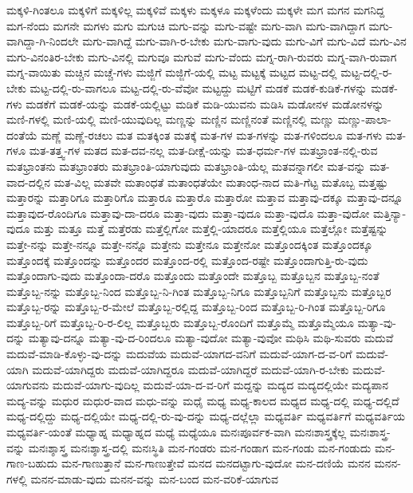 {ಮಕ್ಕಳಿ-ಗಿಂತಲೂ
ಮಕ್ಕಳಿಗೆ
ಮಕ್ಕಳಿಲ್ಲ
ಮಕ್ಕಳಿವೆ
ಮಕ್ಕಳು
ಮಕ್ಕಳೂ
ಮಕ್ಕಳೆಂದು
ಮಕ್ಕಳೇ
ಮಗ
ಮಗನ
ಮಗನಿದ್ದ
ಮಗ-ನೆಂದು
ಮಗನೇ
ಮಗಳು
ಮಗು
ಮಗುಚಿ
ಮಗು-ವನ್ನು
ಮಗು-ವಷ್ಟೇ
ಮಗು-ವಾಗಿ
ಮಗು-ವಾಗಿದ್ದಾಗ
ಮಗು-ವಾಗಿದ್ದಾ-ಗಿ-ನಿಂದಲೇ
ಮಗು-ವಾಗಿದ್ದೆ
ಮಗು-ವಾಗಿ-ರ-ಬೇಕು
ಮಗು-ವಾಗು-ವುದು
ಮಗು-ವಿಗೆ
ಮಗು-ವಿದೆ
ಮಗು-ವಿನ
ಮಗು-ವಿನಂತಿರ-ಬೇಕು
ಮಗು-ವಿನಲ್ಲಿ
ಮಗುವೂ
ಮಗುವೆ
ಮಗು-ವೆಂದು
ಮಗ್ನ-ರಾಗಿ-ರುವರು
ಮಗ್ನ-ವಾಗಿ-ರುವಾಗ
ಮಗ್ನ-ವಾಯಿತು
ಮಚ್ಚಿನ
ಮಚ್ಚೆ-ಗಳು
ಮಜ್ಜಿಗೆ
ಮಜ್ಜಿಗೆ-ಯಲ್ಲಿ
ಮಟ್ಟ
ಮಟ್ಟಕ್ಕೆ
ಮಟ್ಟದ
ಮಟ್ಟ-ದಲ್ಲಿ
ಮಟ್ಟ-ದಲ್ಲಿ-ರ-ಬೇಕು
ಮಟ್ಟ-ದಲ್ಲಿ-ರು-ವಾಗಲೂ
ಮಟ್ಟ-ದಲ್ಲಿ-ರು-ವೆವೋ
ಮಟ್ಟದ್ದು
ಮಟ್ಟಿಗೆ
ಮಡಕೆ
ಮಡಕೆ-ಕುಡಿಕೆ-ಗಳನ್ನು
ಮಡಕೆ-ಗಳು
ಮಡಕೆಗೆ
ಮಡಕೆ-ಯನ್ನು
ಮಡಕೆ-ಯಲ್ಲಿಟ್ಟು
ಮಡಿಕೆ
ಮಡಿ-ಯುವನು
ಮಡಿಸಿ
ಮಡೋನಳ
ಮಡೋನಳನ್ನು
ಮಣಿ-ಗಳಲ್ಲಿ
ಮಣಿ-ಯಲ್ಲಿ
ಮಣಿ-ಯುವುದಿಲ್ಲ
ಮಣ್ಣನ್ನು
ಮಣ್ಣಿನ
ಮಣ್ಣಿನಂತೆ
ಮಣ್ಣಿನಲ್ಲಿ
ಮಣ್ಣು
ಮಣ್ಣು-ಪಾಲಾ-ದಂತೆಯೆ
ಮಣ್ಣೆ
ಮಣ್ಣೆ-ರಚಲು
ಮತ
ಮತಕ್ಕಿಂತ
ಮತಕ್ಕೆ
ಮತ-ಗಳ
ಮತ-ಗಳನ್ನು
ಮತ-ಗಳಿಂದಲೂ
ಮತ-ಗಳು
ಮತ-ಗಳೂ
ಮತ-ತತ್ತ್ವ-ಗಳ
ಮತದ
ಮತ-ದವ-ನಲ್ಲ
ಮತ-ದೀಕ್ಷೆ-ಯನ್ನು
ಮತ-ಧರ್ಮ-ಗಳ
ಮತಭ್ರಾಂತ-ನಲ್ಲಿ-ರುವ
ಮತಭ್ರಾಂತನು
ಮತಭ್ರಾಂತರು
ಮತಭ್ರಾಂತಿ-ಯಾಗುವುದು
ಮತಭ್ರಾಂತಿ-ಯೆಲ್ಲ
ಮತವನ್ನಾಗಲೀ
ಮತ-ವನ್ನು
ಮತ-ವಾದ-ದಲ್ಲಿನ
ಮತ-ವಿಲ್ಲ
ಮತವೇ
ಮತಾಂಧತೆ
ಮತಾಂಧತೆಯೇ
ಮತಾಂಧ-ನಾದ
ಮತಿ-ಗೆಟ್ಟ
ಮತೊಬ್ಬ
ಮತ್ತಷ್ಟು
ಮತ್ತಾರನ್ನು
ಮತ್ತಾರಿಗೂ
ಮತ್ತಾರಿಗೊ
ಮತ್ತಾರೂ
ಮತ್ತಾರೊ
ಮತ್ತಾರೋ
ಮತ್ತಾವ
ಮತ್ತಾವು-ದಕ್ಕೂ
ಮತ್ತಾವು-ದನ್ನೂ
ಮತ್ತಾವುದ-ರೊಂದಿಗೂ
ಮತ್ತಾವು-ದಾ-ದರೂ
ಮತ್ತಾ-ವುದು
ಮತ್ತಾ-ವುದೂ
ಮತ್ತಾ-ವುದೊ
ಮತ್ತಾ-ವುದೋ
ಮತ್ತಿನ್ಯಾ-ವುದೂ
ಮತ್ತು
ಮತ್ತೂ
ಮತ್ತೆ
ಮತ್ತೆರಡು
ಮತ್ತೆಲ್ಲಿಗೋ
ಮತ್ತೆಲ್ಲಿ-ಯಾದರೂ
ಮತ್ತೆಲ್ಲಿಯೂ
ಮತ್ತೆಲ್ಲೋ
ಮತ್ತೆಷ್ಟನ್ನು
ಮತ್ತೇ-ನನ್ನು
ಮತ್ತೇ-ನನ್ನೂ
ಮತ್ತೇ-ನನ್ನೊ
ಮತ್ತೇನು
ಮತ್ತೇನೂ
ಮತ್ತೇನೋ
ಮತ್ತೊಂದಕ್ಕಿಂತ
ಮತ್ತೊಂದಕ್ಕೂ
ಮತ್ತೊಂದಕ್ಕೆ
ಮತ್ತೊಂದನ್ನು
ಮತ್ತೊಂದರ
ಮತ್ತೊಂದ-ರಲ್ಲಿ
ಮತ್ತೊಂದ-ರಷ್ಟೇ
ಮತ್ತೊಂದಾಗುತ್ತಿ-ರು-ವುದು
ಮತ್ತೊಂದಾಗು-ವುದು
ಮತ್ತೊಂದಾ-ದರೊ
ಮತ್ತೊಂದು
ಮತ್ತೊಂದೇ
ಮತ್ತೊಬ್ಬ
ಮತ್ತೊಬ್ಬನ
ಮತ್ತೊಬ್ಬ-ನಂತೆ
ಮತ್ತೊಬ್ಬ-ನನ್ನು
ಮತ್ತೊಬ್ಬ-ನಿಂದ
ಮತ್ತೊಬ್ಬ-ನಿ-ಗಿಂತ
ಮತ್ತೊಬ್ಬ-ನಿಗೂ
ಮತ್ತೊಬ್ಬನಿಗೆ
ಮತ್ತೊಬ್ಬನು
ಮತ್ತೊಬ್ಬರ
ಮತ್ತೊಬ್ಬ-ರನ್ನು
ಮತ್ತೊಬ್ಬ-ರ-ಮೇಲೆ
ಮತ್ತೊಬ್ಬ-ರಲ್ಲಿದ್ದ
ಮತ್ತೊಬ್ಬ-ರಿಂದ
ಮತ್ತೊಬ್ಬ-ರಿ-ಗಿಂತ
ಮತ್ತೊಬ್ಬ-ರಿಗೂ
ಮತ್ತೊಬ್ಬ-ರಿಗೆ
ಮತ್ತೊಬ್ಬ-ರಿ-ರ-ಲಿಲ್ಲ
ಮತ್ತೊಬ್ಬರು
ಮತ್ತೊಬ್ಬ-ರೊಂದಿಗೆ
ಮತ್ತೊಮ್ಮೆ
ಮತ್ತೊಮ್ಮೆಯೂ
ಮತ್ಯಾ-ವು-ದನ್ನು
ಮತ್ಯಾವು-ದನ್ನೂ
ಮತ್ಯಾ-ವು-ದ-ರಿಂದಲೂ
ಮತ್ಯಾ-ವುದೋ
ಮತ್ಯಾ-ವುವೋ
ಮಥಿಸಿ
ಮಥಿ-ಸುವರು
ಮದುವೆ
ಮದುವೆ-ಮಾಡಿ-ಕೊಳ್ಳು-ವು-ದನ್ನು
ಮದುವೆಯ
ಮದುವೆ-ಯಾಗದ-ವನಿಗೆ
ಮದುವೆ-ಯಾಗ-ದ-ವ-ರಿಗೆ
ಮದುವೆ-ಯಾಗಿ
ಮದುವೆ-ಯಾಗಿದ್ದರು
ಮದುವೆ-ಯಾಗಿದ್ದರೂ
ಮದುವೆ-ಯಾಗಿದ್ದರೆ
ಮದುವೆ-ಯಾಗಿ-ರ-ಬೇಕು
ಮದುವೆ-ಯಾಗುವನು
ಮದುವೆ-ಯಾಗು-ವುದಿಲ್ಲ
ಮದುವೆ-ಯಾ-ದ-ವ-ರಿಗೆ
ಮದ್ದನ್ನು
ಮದ್ಯದ
ಮದ್ಯದಲ್ಲಿಯೇ
ಮದ್ಯಪಾನ
ಮದ್ಯ-ವನ್ನು
ಮಧುರ
ಮಧುರ-ವಾದ
ಮಧು-ವನ್ನು
ಮಧೈ
ಮಧ್ಯ
ಮಧ್ಯ-ಕಾಲದ
ಮಧ್ಯದ
ಮಧ್ಯ-ದಲ್ಲಿ
ಮಧ್ಯ-ದಲ್ಲಿದೆ
ಮಧ್ಯ-ದಲ್ಲಿದ್ದು
ಮಧ್ಯ-ದಲ್ಲಿಯೇ
ಮಧ್ಯ-ದಲ್ಲಿ-ರು-ವು-ದನ್ನು
ಮಧ್ಯ-ದಲ್ಲೆಲ್ಲಾ
ಮಧ್ಯವರ್ತಿ
ಮಧ್ಯವರ್ತಿಗೆ
ಮಧ್ಯವರ್ತಿಯ
ಮಧ್ಯವರ್ತಿ-ಯಂತೆ
ಮಧ್ಯಾಹ್ನ
ಮಧ್ಯಾಹ್ನದ
ಮಧ್ಯೆ
ಮಧ್ಯೆಯೂ
ಮನಃಪೂರ್ವಕ-ವಾಗಿ
ಮನಃಶಾಸ್ತ್ರಕ್ಕೆಲ್ಲ
ಮನಃಶಾಸ್ತ್ರ-ವನ್ನು
ಮನಃಶ್ಶಾಸ್ತ್ರ
ಮನಃಶ್ಶಾಸ್ತ್ರ-ದಲ್ಲಿ
ಮನಃಸ್ಥಿತಿ
ಮನ-ಗಂಡರು
ಮನ-ಗಂಡಾಗ
ಮನ-ಗಂಡು
ಮನ-ಗಂಡುದು
ಮನ-ಗಾಣ-ಬಹುದು
ಮನ-ಗಾಣುತ್ತಾನೆ
ಮನ-ಗಾಣುತ್ತೇವೆ
ಮನದ
ಮನದಟ್ಟಾಗು-ವುದೋ
ಮನ-ದಣಿಯೆ
ಮನನ
ಮನನ-ಗಳಲ್ಲಿ
ಮನನ-ಮಾಡು-ವುದು
ಮನನ-ವನ್ನು
ಮನ-ಬಂದ
ಮನ-ವರಿಕೆ-ಯಾಗುವ
}

